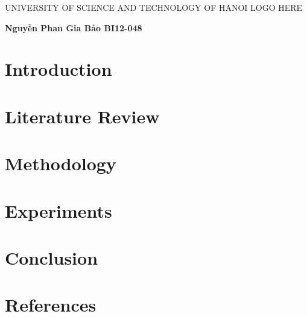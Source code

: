\documentclass[14pt]{extreport}
\begin{document}
\begin{titlepage}
    \begin{center}
        \begin{adjustwidth}{-100pt}{-100pt}
            \centering
            {\fontsize{20}{15}\selectfont UNIVERSITY OF SCIENCE AND TECHNOLOGY OF HANOI}
            \vspace{1cm}
            \newline
            \vspace{2cm}
            {\HUGE LOGO HERE}
            \vspace{2cm}

        \end{adjustwidth}
        \linespread{1}\LARGE \bfseries <Project name>
        \newline
        \vspace{4cm}
        \textbf{\Large Nguyễn Phan Gia Bảo}
        \newline
        \textbf{\Large BI12-048}
        \date{}
    \end{center}
\end{titlepage}


\begingroup\singlespacing
\tableofcontents
\endgroup
\clearpage


\chapter{Introduction}

\chapter{Literature Review}

\chapter{Methodology}

\chapter{Experiments}

\chapter{Conclusion}

\chapter{References}
\end{document}
